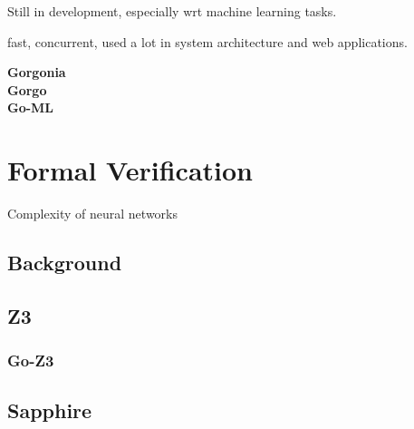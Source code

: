 Still in development, especially wrt machine learning tasks.\

fast, concurrent, used a lot in system architecture and web applications.

\textbf{Gorgonia}\\
\textbf{Gorgo}\\
\textbf{Go-ML}\\



\section{Formal Verification}

Complexity of neural networks


\subsection{Background}
\subsection{Z3}
\subsubsection{Go-Z3}

\subsection{Sapphire}
